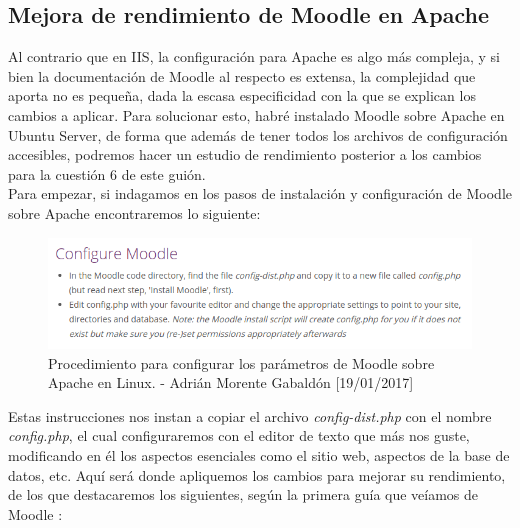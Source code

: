 	\subsection{Mejora de rendimiento de Moodle en Apache}
	Al contrario que en IIS, la configuración para Apache es algo más compleja, y si bien la documentación de Moodle al respecto es extensa, la complejidad que aporta no es pequeña, dada la escasa especificidad con la que se explican los cambios a aplicar. Para solucionar esto, habré instalado Moodle sobre Apache en Ubuntu Server, de forma que además de tener todos los archivos de configuración accesibles, podremos hacer un estudio de rendimiento posterior a los cambios para la cuestión 6 de este guión.\\
	Para empezar, si indagamos en los pasos de instalación y configuración de Moodle sobre Apache encontraremos lo siguiente:
	\begin{figure}[H]
		\centering
		\includegraphics[scale=0.5]{pasos-moodle}
		\caption{Procedimiento para configurar los parámetros de Moodle sobre Apache en Linux. - Adrián Morente Gabaldón [19/01/2017]}
		\label{figura13}
	\end{figure}
	Estas instrucciones nos instan a copiar el archivo \emph{config-dist.php} con el nombre \emph{config.php}, el cual configuraremos con el editor de texto que más nos guste, modificando en él los aspectos esenciales como el sitio web, aspectos de la base de datos, etc. Aquí será donde apliquemos los cambios para mejorar su rendimiento, de los que destacaremos los siguientes, según la primera guía que veíamos de Moodle \cite{moodleapache}:
